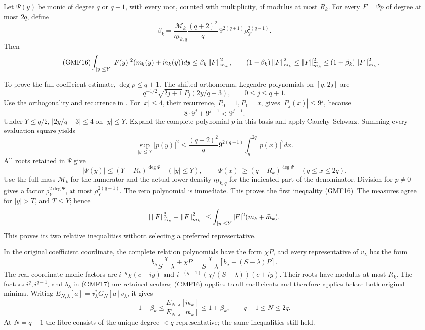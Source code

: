 Let \(\Psi(y)\) be monic of degree \(q\) or \(q-1\), with
every root, counted with multiplicity, of modulus at most \(R_k\).
For every \(F=\Psi p\) of degree at most \(2q\), define
\begin{equation}\tag{GMF15}
 \beta_k=
 \frac{\mathcal M_k}{\underline m_{k,q}}
 \frac{(q+2)^2}{q}\,9^{2(q+1)}
                     \rho_Y^{2(q-1)}.
\end{equation}
Then
\begin{equation}\tag{GMF16}
 \int_{|y|\le Y}|F(y)|^2(m_k(y)+\widetilde m_k(y))dy
 \le\beta_k\left\lVert F\right\rVert_{m_k}^2,\qquad
 (1-\beta_k)\left\lVert F\right\rVert_{m_k}^2
 \le\left\lVert F\right\rVert_{\widetilde m_k}^2
 \le(1+\beta_k)\left\lVert F\right\rVert_{m_k}^2.
\end{equation}

To prove the full coefficient estimate, \(\deg p\le q+1\).
The shifted orthonormal Legendre polynomials on \([q,2q]\)
are
\[
 q^{-1/2}\sqrt{2j+1}\,P_j(2y/q-3),\qquad 0\le j\le q+1.
\]
Use the orthogonality and recurrence in
\cite[Tables 18.3.1 and 18.9.1]{a02gmf:dlmfLegendre}.
For \(|x|\le4\), their recurrence, \(P_0=1,P_1=x\), gives
\(|P_j(x)|\le9^j\), because
\[
 8\cdot9^j+9^{j-1}<9^{j+1}.
\]
Under \(Y\le q/2\), \(|2y/q-3|\le4\) on \(|y|\le Y\).
Expand the complete polynomial \(p\) in this basis and
apply Cauchy--Schwarz.  Summing every evaluation square yields
\[
 \sup_{|y|\le Y}|p(y)|^2
 \le\frac{(q+2)^2}{q}9^{2(q+1)}
                         \int_q^{2q}|p(x)|^2dx.
\]
All roots retained in \(\Psi\) give
\[
 |\Psi(y)|\le(Y+R_k)^{\deg\Psi}\quad(|y|\le Y),\qquad
 |\Psi(x)|\ge(q-R_k)^{\deg\Psi}\quad(q\le x\le2q).
\]
Use the full mass \(\mathcal M_k\) for the numerator and the
actual lower density \(\underline m_{k,q}\) for the indicated
part of the denominator.  Division for \(p\ne0\) gives a
factor \(\rho_Y^{2\deg\Psi}\), at most
\(\rho_Y^{2(q-1)}\).  The zero polynomial is immediate.
This proves the first inequality (GMF16).
The measures agree for \(|y|>T\), and \(T\le Y\); hence
\[
 |\left\lVert F\right\rVert_{\widetilde m_k}^2-\left\lVert F\right\rVert_{m_k}^2|
 \le\int_{|y|\le Y}|F|^2(m_k+\widetilde m_k).
\]
This proves its two relative inequalities without selecting
a preferred representative.

In the original coefficient coordinate, the complete relation
polynomials have the form \(\chi P\), and every representative
of \(v_\lambda\) has the form
\begin{equation}\tag{GMF17}
 b_\lambda\frac{\chi}{S-\lambda}+\chi P
 =\frac{\chi}{S-\lambda}
                  [b_\lambda+(S-\lambda)P].
\end{equation}
The real-coordinate monic factors are
\(i^{-q}\chi(c+iy)\) and
\(i^{-(q-1)}(\chi/(S-\lambda))(c+iy)\).
Their roots have modulus at most \(R_k\).
The factors \(i^q,i^{q-1}\), and \(b_\lambda\) in (GMF17)
are retained scalars; (GMF16) applies to all coefficients and
therefore applies before both original minima.
Writing
\(E_{N,\lambda}[a]=v_\lambda^*G_N[a]v_\lambda\), it gives
\begin{equation}\tag{GMF18}
 1-\beta_k\le
 \frac{E_{N,\lambda}[\widetilde m_k]}{E_{N,\lambda}[m_k]}
 \le1+\beta_k,\qquad q-1\le N\le2q.
\end{equation}
At \(N=q-1\) the fibre consists of the unique degree-\(<q\)
representative; the same inequalities still hold.

